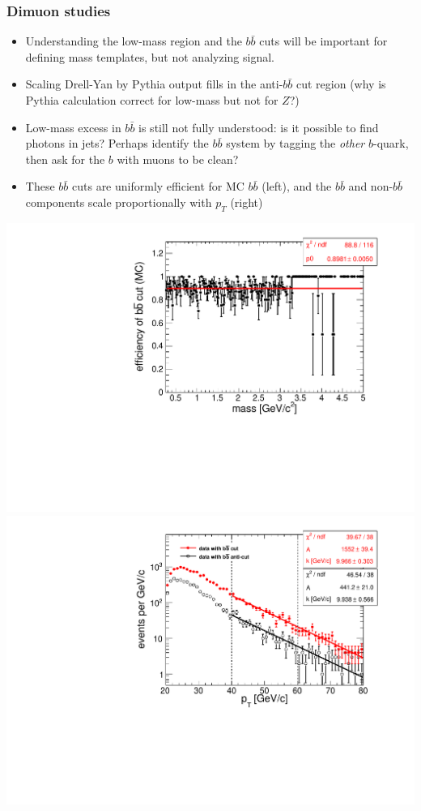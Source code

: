 \documentclass[compress]{beamer}
\begin{document}
\begin{frame}
\frametitle{Dimuon studies}

\begin{itemize}
\item Understanding the low-mass region and the $b\bar{b}$ cuts will
  be important for defining mass templates, but not analyzing signal.

\item Scaling Drell-Yan by Pythia output fills in the anti-$b\bar{b}$
  cut region (why is Pythia calculation correct for low-mass but not
  for $Z$?)

\item Low-mass excess in $b\bar{b}$ is still not fully understood: is
  it possible to find photons in jets?  Perhaps identify the
  $b\bar{b}$ system by tagging the {\it other} $b$-quark, then ask for
  the $b$ with muons to be clean?

\item These $b\bar{b}$ cuts are uniformly efficient for MC $b\bar{b}$
  (left), and the $b\bar{b}$ and non-$b\bar{b}$ components scale
  proportionally with $p_T$ (right)
\end{itemize}

\includegraphics[width=0.5\linewidth]{support_bbbarcut_efficiency.pdf}
\includegraphics[width=0.5\linewidth]{support_bbbarcut_limits.pdf}
\end{frame}
\end{document}
